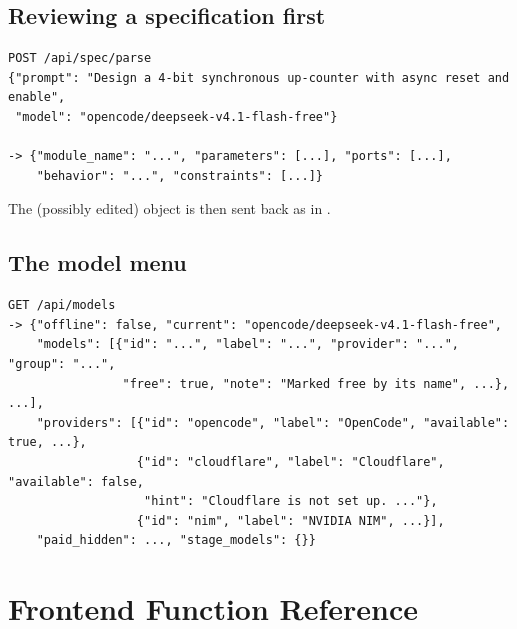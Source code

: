 \section{Reviewing a specification first}

\begin{lstlisting}[style=plain]
POST /api/spec/parse
{"prompt": "Design a 4-bit synchronous up-counter with async reset and enable",
 "model": "opencode/deepseek-v4.1-flash-free"}

-> {"module_name": "...", "parameters": [...], "ports": [...],
    "behavior": "...", "constraints": [...]}
\end{lstlisting}
The (possibly edited) object is then sent back as  in .

\section{The model menu}

\begin{lstlisting}[style=plain]
GET /api/models
-> {"offline": false, "current": "opencode/deepseek-v4.1-flash-free",
    "models": [{"id": "...", "label": "...", "provider": "...", "group": "...",
                "free": true, "note": "Marked free by its name", ...}, ...],
    "providers": [{"id": "opencode", "label": "OpenCode", "available": true, ...},
                  {"id": "cloudflare", "label": "Cloudflare", "available": false,
                   "hint": "Cloudflare is not set up. ..."},
                  {"id": "nim", "label": "NVIDIA NIM", ...}],
    "paid_hidden": ..., "stage_models": {}}
\end{lstlisting}

\chapter{Frontend Function Reference}
\label{app:frontend}

